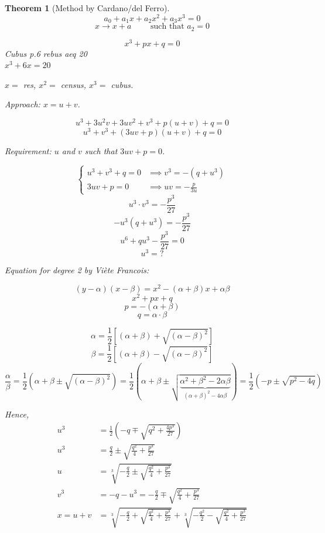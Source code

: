 \documentclass[a4paper]{article}
\newcounter{lecref}[section]
\numberwithin{lecref}{section}
\newtheorem{theorem}[lecref]{Theorem}
\begin{document}
\begin{theorem}[Method by Cardano/del Ferro] %
  \[ a_0 + a_1 x + a_2 x^2 + a_3 x^3 = 0 \]
  \[ x \to x + a \qquad \text{ such that } a_2 = 0 \]

  \[ x^3 + px + q = 0 \]
  Cubus p.6 rebus aeq 20 \\
  $x^3 + 6x = 20$

  $x = $ res, $x^2 = $ census, $x^3 = $ cubus.

  Approach: $x = u + v$.

  \[ u^3 + 3u^2v + 3uv^2 + v^3 + p(u + v) + q = 0 \]
  \[ u^3 + v^3 + (3uv + p)(u + v) + q = 0 \]

  Requirement:
  $u$ and $v$ such that $3uv + p = 0$.

  \[
    \begin{cases}
      u^3 + v^3 + q = 0 & \implies v^3 = -(q + u^3) \\
      3uv + p = 0 & \implies uv = -\frac{p}{3u}
    \end{cases}
  \]
  \[ u^3 \cdot v^3 = -\frac{p^3}{27} \]
  \[ -u^3 (q + u^3) = -\frac{p^3}{27} \]
  \[ u^6 + qu^3 - \frac{p^3}{27} = 0 \]
  \[ u^3 = ? \]

  Equation for degree 2 by Vi\`ete Francois:

  \[ (y - \alpha)(x - \beta) = x^2 - (\alpha + \beta) x + \alpha \beta \]
  \[ x^2 + px + q \]
  \[ p = -(\alpha + \beta) \]
  \[ q = \alpha \cdot \beta \]

  \[ \alpha = \frac12 \left[(\alpha + \beta) + \sqrt{(\alpha - \beta)^2}\right] \]
  \[ \beta = \frac12 \left[(\alpha + \beta) - \sqrt{(\alpha - \beta)^2}\right] \]
  \[
    \frac\alpha\beta = \frac12 \left(\alpha + \beta \pm \sqrt{(\alpha - \beta)^2}\right)
    = \frac12 \left(\alpha + \beta \pm \sqrt{\underbrace{\alpha^2 + \beta^2 - 2\alpha\beta}_{(\alpha + \beta)^2 - 4\alpha\beta}}\right)
    = \frac12 \left(-p \pm \sqrt{p^2 - 4q}\right)
  \]

  Hence,
  \begin{align*}
    u^3 &= \frac12\left(-q \mp \sqrt{q^2 + \frac{4p^3}{27}}\right) \\
    u^3 &= \frac{q}2 \pm \sqrt{\frac{q^2}{4} + \frac{p^3}{27}} \\
    u &= \sqrt[3]{-\frac{q}2 \pm \sqrt{\frac{q^2}{4} + \frac{p^3}{27}}} \\
    v^3 &= -q - u^3 = -\frac{q}{2} \mp \sqrt{\frac{q^2}{4} + \frac{p^3}{27}} \\
    x = u + v &= \sqrt[3]{-\frac{q}2 + \sqrt{\frac{q^2}{4} + \frac{p^3}{27}}} + \sqrt[3]{-\frac{q^2}{2} - \sqrt{\frac{q^2}{4} + \frac{p^3}{27}}}
  \end{align*}
\end{theorem}
\end{document}
